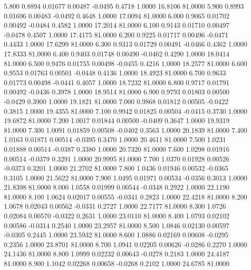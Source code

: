    5.800   0.8894   0.01677   0.00487  -0.0495   0.4718   1.0000  16.8106  81.0000
   5.900   0.8993   0.01696   0.00483  -0.0492   0.4648   1.0000  17.0094  81.0000
   6.000   0.9065   0.01702   0.00492  -0.0484   0.4582   1.0000  17.2014  81.0000
   6.100   0.9143   0.01710   0.00497  -0.0478   0.4507   1.0000  17.4175  81.0000
   6.200   0.9225   0.01717   0.00496  -0.0471   0.4433   1.0000  17.6299  81.0000
   6.300   0.9313   0.01729   0.00491  -0.0466   0.4362   1.0000  17.8333  81.0000
   6.400   0.9403   0.01748   0.00490  -0.0462   0.4290   1.0000  18.0414  81.0000
   6.500   0.9476   0.01755   0.00498  -0.0455   0.4216   1.0000  18.2577  81.0000
   6.600   0.9553   0.01763   0.00501  -0.0448   0.4136   1.0000  18.4923  81.0000
   6.700   0.9633   0.01773   0.00498  -0.0441   0.4057   1.0000  18.7232  81.0000
   6.800   0.9717   0.01791   0.00492  -0.0436   0.3978   1.0000  18.9514  81.0000
   6.900   0.9793   0.01803   0.00500  -0.0429   0.3900   1.0000  19.1821  81.0000
   7.000   0.9868   0.01812   0.00505  -0.0422   0.3815   1.0000  19.4355  81.0000
   7.100   0.9942   0.01825   0.00504  -0.0415   0.3730   1.0000  19.6872  81.0000
   7.200   1.0017   0.01844   0.00500  -0.0409   0.3647   1.0000  19.9319  81.0000
   7.300   1.0091   0.01859   0.00508  -0.0402   0.3563   1.0000  20.1839  81.0000
   7.400   1.0163   0.01871   0.00514  -0.0395   0.3470   1.0000  20.4611  81.0000
   7.500   1.0231   0.01888   0.00514  -0.0387   0.3380   1.0000  20.7320  81.0000
   7.600   1.0298   0.01916   0.00514  -0.0379   0.3291   1.0000  20.9995  81.0000
   7.700   1.0370   0.01928   0.00526  -0.0373   0.3201   1.0000  21.2702  81.0000
   7.800   1.0436   0.01946   0.00532  -0.0365   0.3105   1.0000  21.5622  81.0000
   7.900   1.0495   0.01971   0.00534  -0.0356   0.3013   1.0000  21.8398  81.0000
   8.000   1.0558   0.01999   0.00544  -0.0348   0.2922   1.0000  22.1190  81.0000
   8.100   1.0624   0.02017   0.00555  -0.0341   0.2823   1.0000  22.4218  81.0000
   8.200   1.0678   0.02043   0.00562  -0.0331   0.2727   1.0000  22.7177  81.0000
   8.300   1.0726   0.02084   0.00570  -0.0322   0.2631   1.0000  23.0110  81.0000
   8.400   1.0793   0.02102   0.00586  -0.0314   0.2540   1.0000  23.2957  81.0000
   8.500   1.0846   0.02130   0.00597  -0.0305   0.2445   1.0000  23.5932  81.0000
   8.600   1.0886   0.02169   0.00608  -0.0295   0.2356   1.0000  23.8701  81.0000
   8.700   1.0941   0.02205   0.00626  -0.0286   0.2270   1.0000  24.1436  81.0000
   8.800   1.0999   0.02232   0.00643  -0.0278   0.2183   1.0000  24.4187  81.0000
   8.900   1.1042   0.02268   0.00658  -0.0268   0.2102   1.0000  24.6785  81.0000

